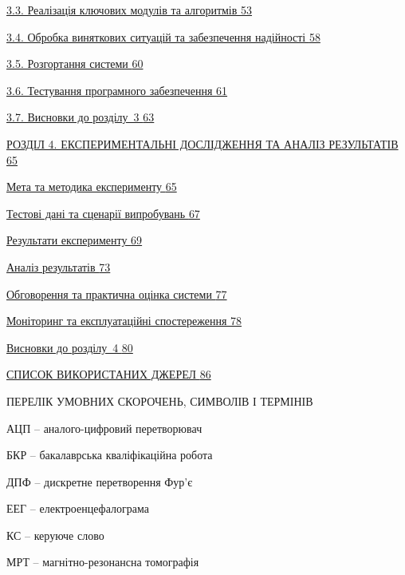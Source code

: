 \documentclass[
]{article}
\begin{document}
\hyperref[_Toc229681134]{3.3. Реалізація ключових модулів та алгоритмів
\hyperref[_Toc229681134]{53}}

\hyperref[_Toc229681146]{3.4. Обробка виняткових ситуацій та
забезпечення надійності \hyperref[_Toc229681146]{58}}

\hyperref[_Toc229681152]{3.5. Розгортання системи
\hyperref[_Toc229681152]{60}}

\hyperref[_Toc229681157]{3.6. Тестування програмного забезпечення
\hyperref[_Toc229681157]{61}}

\hyperref[_Toc229681163]{3.7. Висновки до розділу~3
\hyperref[_Toc229681163]{63}}

\hyperref[_Toc229681164]{РОЗДІЛ 4. ЕКСПЕРИМЕНТАЛЬНІ ДОСЛІДЖЕННЯ ТА
АНАЛІЗ РЕЗУЛЬТАТІВ \hyperref[_Toc229681164]{65}}

\hyperref[_Toc229681165]{Мета та методика експерименту
\hyperref[_Toc229681165]{65}}

\hyperref[_Toc229681166]{Тестові дані та сценарії випробувань
\hyperref[_Toc229681166]{67}}

\hyperref[_Toc229681167]{Результати експерименту
\hyperref[_Toc229681167]{69}}

\hyperref[_Toc229681174]{Аналіз результатів
\hyperref[_Toc229681174]{73}}

\hyperref[_Toc229681182]{Обговорення та практична оцінка системи
\hyperref[_Toc229681182]{77}}

\hyperref[Xddcc2d41e218d4eab0104affeeaeb116ef3d72e]{Моніторинг та
експлуатаційні спостереження
\hyperref[Xddcc2d41e218d4eab0104affeeaeb116ef3d72e]{78}}

\hyperref[ux432ux438ux441ux43dux43eux432ux43aux438-ux434ux43e-ux440ux43eux437ux434ux456ux43bux443-4]{Висновки
до розділу~4
\hyperref[ux432ux438ux441ux43dux43eux432ux43aux438-ux434ux43e-ux440ux43eux437ux434ux456ux43bux443-4]{80}}

\hyperref[_Toc228305380]{СПИСОК ВИКОРИСТАНИХ ДЖЕРЕЛ
\hyperref[_Toc228305380]{86}}

\protect{}\label{_Toc230130249}{}ПЕРЕЛІК УМОВНИХ СКОРОЧЕНЬ,
СИМВОЛІВ І ТЕРМІНІВ

АЦП -- аналого-цифровий перетворювач

БКР -- бакалаврська кваліфікаційна робота

ДПФ -- дискретне перетворення Фур'є

ЕЕГ -- електроенцефалограма

КС -- керуюче слово

МРТ -- магнітно-резонансна томографія
\end{document}
